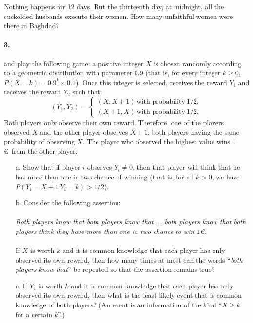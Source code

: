 \documentclass[a4paper,notitlepage,12pt]{article}
\newcommand{\X}{X}
\newcommand{\Y}{Y}
\begin{document}
Nothing happens for 12 days. But the thirteenth day, at midnight, all the cuckolded husbands execute their women. How many unfaithful women were there in Baghdad?

\paragraph{3. } \TAone{} and \TAtwo{} play the following game: a positive integer $\X$ is chosen randomly according to a geometric distribution with parameter $0.9$ (that is, for every integer $k \geq 0$, $P(\X = k) = 0.9 ^ k \times 0.1$). Once this integer is selected, \TAone{} receives the reward $\Y_1$ and \TAtwo{} receives the reward $\Y_2$ such that:
\begin{equation*}
	(\Y_1, \Y_2) = 
	\begin{cases}
		(\X, \X+1) \ \text{with probability} \ 1/2, \\
		(\X+1, \X) \ \text{with probability} \ 1/2.
	\end{cases}
\end{equation*}
Both players only observe their own reward. Therefore, one of the players observed $\X$ and the other player observes $\X + 1$, both players having the same probability of observing $\X$. The player who observed the highest value wins $1$\euro \ from the other player.
\begin{itemize}
	\item[a.] Show that if player $i$ observes $\Y_i \neq 0$, then that player will think that he has more than one in two chance of winning (that is, for all $k > 0$, we have $P(\Y_i = \X+1 | \Y_i = k) > 1/2$).
	\item[b.] Consider the following assertion: \\
	\\
	\textit{Both players know that both players know that ... both players know that both players think they have more than one in two chance to win $1$\euro.} \\
	\\
	If $\X$ is worth $k$ and it is common knowledge that each player has only observed its own reward, then how many times at most can the words ``\textit{both players know that}'' be repeated so that the assertion remains true?
	\item[c.] If $\Y_1$ is worth $k$ and it is common knowledge that each player has only observed its own reward, then what is the least likely event that is common knowledge of both players? (An event is an information of the kind ``$\X \geq k$ for a certain $k$''.)
\end{itemize}
\end{document}
